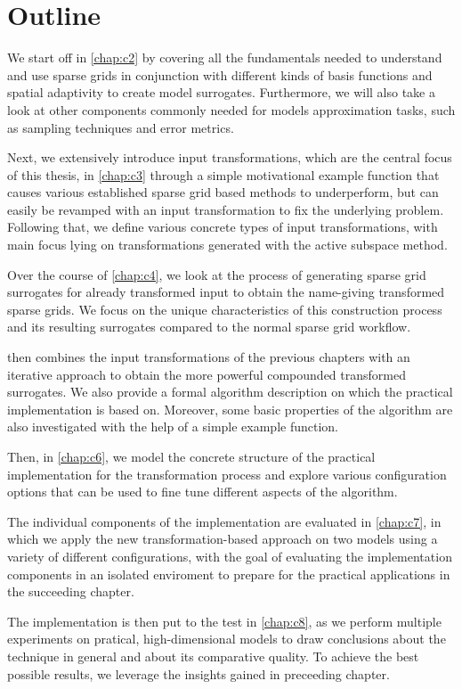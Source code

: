 \documentclass[
  a4paper,  %
  twoside,  %
  bibliography=totoc,
  headsepline,
  cleardoublepage=empty,
  parskip=half,
  draft=false
]{scrbook}
\begin{document}
\section{Outline}

We start off in \cref{chap:c2} by covering all the fundamentals needed to understand and use sparse grids in conjunction with different kinds of basis functions and spatial adaptivity to create model surrogates.
Furthermore, we will also take a look at other components commonly needed for models approximation tasks, such as sampling techniques and error metrics.

Next, we extensively introduce input transformations, which are the central focus of this thesis, in \cref{chap:c3} through a simple motivational example function that causes various established sparse grid based methods to underperform, but can easily be revamped with an input transformation to fix the underlying problem.
Following that, we define various concrete types of input transformations, with main focus lying on transformations generated with the active subspace method.

Over the course of \cref{chap:c4}, we look at the process of generating sparse grid surrogates for already transformed input to obtain the name-giving transformed sparse grids.
We focus on the unique characteristics of this construction process and its resulting surrogates compared to the normal sparse grid workflow.

 then combines the input transformations of the previous chapters with an iterative approach to obtain the more powerful compounded transformed surrogates.
We also provide a formal algorithm description on which the practical implementation is based on.
Moreover, some basic properties of the algorithm are also investigated with the help of a simple example function.

Then, in \cref{chap:c6}, we model the concrete structure of the practical implementation for the transformation process and explore various configuration options that can be used to fine tune different aspects of the algorithm.

The individual components of the implementation are evaluated in \cref{chap:c7}, in which we apply the new transformation-based approach on two models using a variety of different configurations, with the goal of evaluating the implementation components in an isolated enviroment to prepare for the practical applications in the succeeding chapter.

The implementation is then put to the test in \cref{chap:c8}, as we perform multiple experiments on pratical, high-dimensional models to draw conclusions about the technique in general and about its comparative quality.
To achieve the best possible results, we leverage the insights gained in preceeding chapter.
\end{document}
